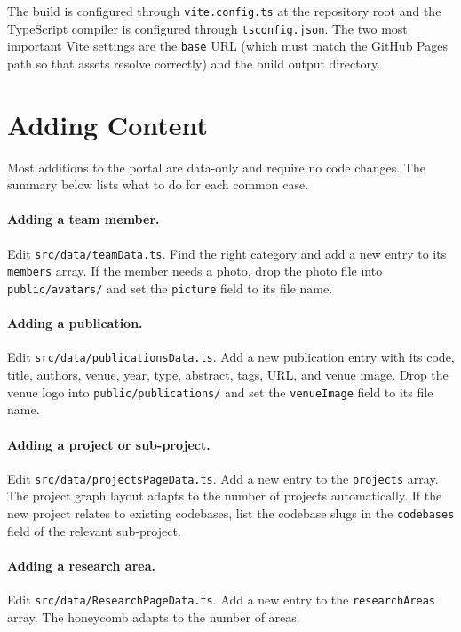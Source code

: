 The build is configured through \texttt{vite.config.ts} at the repository root and the TypeScript compiler is configured through \texttt{tsconfig.json}. The two most important Vite settings are the \texttt{base} URL (which must match the GitHub Pages path so that assets resolve correctly) and the build output directory.

\section{Adding Content}\label{sec:dev-adding}

Most additions to the portal are data-only and require no code changes. The summary below lists what to do for each common case.

\paragraph{Adding a team member.} Edit \texttt{src/data/teamData.ts}. Find the right category and add a new entry to its \texttt{members} array. If the member needs a photo, drop the photo file into \texttt{public/avatars/} and set the \texttt{picture} field to its file name.

\paragraph{Adding a publication.} Edit \texttt{src/data/publicationsData.ts}. Add a new publication entry with its code, title, authors, venue, year, type, abstract, tags, URL, and venue image. Drop the venue logo into \texttt{public/publications/} and set the \texttt{venueImage} field to its file name.

\paragraph{Adding a project or sub-project.} Edit \texttt{src/data/projectsPageData.ts}. Add a new entry to the \texttt{projects} array. The project graph layout adapts to the number of projects automatically. If the new project relates to existing codebases, list the codebase slugs in the \texttt{codebases} field of the relevant sub-project.

\paragraph{Adding a research area.} Edit \texttt{src/data/ResearchPageData.ts}. Add a new entry to the \texttt{researchAreas} array. The honeycomb adapts to the number of areas.

